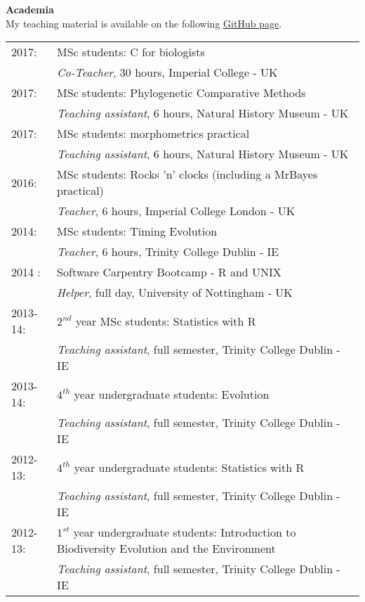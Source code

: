 \documentclass[10pt,a4paper]{article}
\begin{document}
{\raggedright\textbf{Academia}\\[1.5ex]
My teaching material is available on the following \href{https://github.com/TGuillermeTeaching}{GitHub page}.
\begin{tabular}{ll}
2017: & MSc students: C for biologists\\
& \textit{Co-Teacher}, 30 hours, Imperial College - UK \\
2017: & MSc students: Phylogenetic Comparative Methods\\
& \textit{Teaching assistant}, 6 hours, Natural History Museum - UK \\
2017: & MSc students: morphometrics practical\\
& \textit{Teaching assistant}, 6 hours, Natural History Museum - UK \\
2016: & MSc students: Rocks 'n' clocks (including a MrBayes practical)\\
& \textit{Teacher}, 6 hours, Imperial College London - UK \\
2014: & MSc students: Timing Evolution \\
& \textit{Teacher}, 6 hours, Trinity College Dublin - IE \\
2014 : & Software Carpentry Bootcamp - R and UNIX \\
& \textit{Helper}, full day, University of Nottingham - UK \\
2013-14: & $2^{nd}$ year MSc students: Statistics with R \\
& \textit{Teaching assistant}, full semester, Trinity College Dublin - IE \\
2013-14: & $4^{th}$ year undergraduate students: Evolution\\
& \textit{Teaching assistant}, full semester, Trinity College Dublin - IE\\
2012-13: & $4^{th}$ year undergraduate students: Statistics with R\\
& \textit{Teaching assistant}, full semester, Trinity College Dublin - IE\\
2012-13: & $1^{st}$ year undergraduate students: Introduction to Biodiversity Evolution and the Environment\\
& \textit{Teaching assistant}, full semester, Trinity College Dublin - IE\\
\end{tabular}

}
\end{document}

